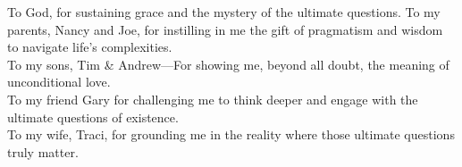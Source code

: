 

\begin{dedication}

\begin{flushleft}

To God, for sustaining grace and the mystery of the ultimate questions. 
To my parents, Nancy and Joe, for instilling in me the gift of pragmatism and wisdom to navigate life’s complexities. \\
To my sons, Tim \& Andrew—For showing me, beyond all doubt, the meaning of unconditional love. \\ 
To my friend Gary for challenging me to think deeper and engage with the ultimate questions of existence. \\
To my wife, Traci, for grounding me in the reality where those ultimate questions truly matter. \\

\end{flushleft}

\end{dedication}




